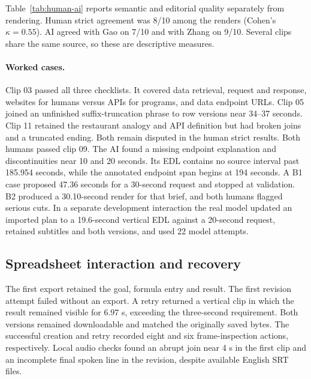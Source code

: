 Table~\ref{tab:human-ai} reports semantic and editorial quality separately from rendering. Human strict agreement was 8/10 among the renders (Cohen's $\kappa=0.55$). AI agreed with Gao on 7/10 and with Zhang on 9/10. Several clips share the same source, so these are descriptive measures.

\paragraph{Worked cases.}
Clip 03 passed all three checklists. It covered data retrieval, request and response, websites for humans versus APIs for programs, and data endpoint URLs. Clip 05 joined an unfinished suffix-truncation phrase to row versions near 34--37 seconds. Clip 11 retained the restaurant analogy and API definition but had broken joins and a truncated ending. Both remain disputed in the human strict results. Both humans passed clip 09. The AI found a missing endpoint explanation and discontinuities near 10 and 20 seconds. Its EDL contains no source interval past 185.954 seconds, while the annotated endpoint span begins at 194 seconds. A B1 case proposed 47.36 seconds for a 30-second request and stopped at validation. B2 produced a 30.10-second render for that brief, and both humans flagged serious cuts. In a separate development interaction the real model updated an imported plan to a 19.6-second vertical EDL against a 20-second request, retained subtitles and both versions, and used 22 model attempts.

\subsection{Spreadsheet interaction and recovery}
\label{sec:spreadsheet}
The first export retained the goal, formula entry and result. The first revision attempt failed without an export. A retry returned a vertical clip in which the result remained visible for 6.97 s, exceeding the three-second requirement. Both versions remained downloadable and matched the originally saved bytes. The successful creation and retry recorded eight and six frame-inspection actions, respectively. Local audio checks found an abrupt join near 4 s in the first clip and an incomplete final spoken line in the revision, despite available English SRT files.

